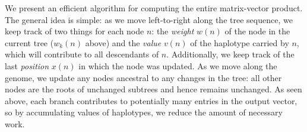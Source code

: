 
We present an efficient algorithm for computing the entire matrix-vector product.
The general idea is simple: as we move left-to-right along the tree sequence,
we keep track of two things for each node $n$:
the \textit{weight} $w(n)$ of the node in the current tree ($w_k(n)$ above) and
the \textit{value} $v(n)$ of the haplotype carried by $n$,
which will contribute to all descendants of $n$.
Additionally, we keep track of the last \textit{position} $x(n)$ in which the node was updated.
As we move along the genome, we update any nodes ancestral to any changes in the tree:
all other nodes are the roots of unchanged subtrees and hence remains unchanged.
As seen above, each branch contributes to potentially many entries in the output vector,
so by accumulating values of haplotypes, we reduce the amount of necessary work.


